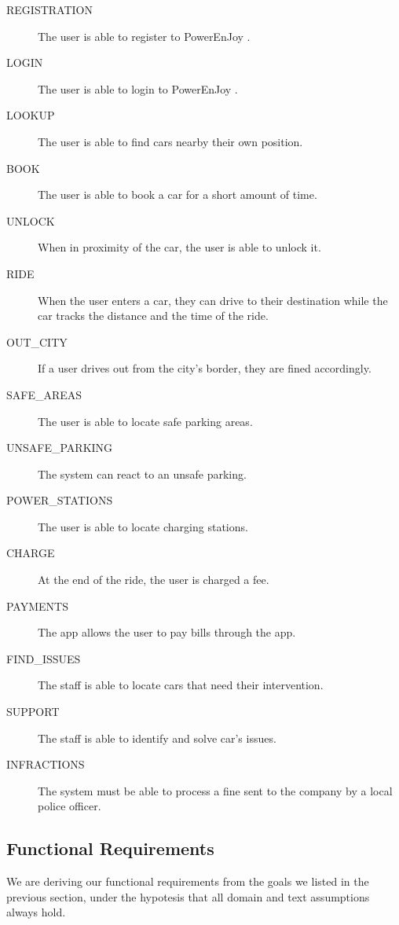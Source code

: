 \documentclass[11pt]{article} %
\newcommand{\pe}{PowerEnJoy }
\begin{document}
 \begin{description}
 	\item[REGISTRATION] The user is able to register to \pe.
	\item[LOGIN] The user is able to login to \pe.
 	\item[LOOKUP] The user is able to find cars nearby their own position.
 	\item[BOOK] The user is able to book a car for a short amount of time.
 	\item[UNLOCK] When in proximity of the car, the user is able to unlock it.
	\item[RIDE] When the user enters a car, they can drive to their destination while the car tracks the distance and the time of the ride.
	\item[OUT\_CITY] If a user drives out from the city's border, they are fined accordingly.
 	\item[SAFE\_AREAS] The user is able to locate safe parking areas.
	\item[UNSAFE\_PARKING] The system can react to an unsafe parking.
	\item[POWER\_STATIONS] The user is able to locate charging stations.
	\item[CHARGE] At the end of the ride, the user is charged a fee.
	\item[PAYMENTS] The app allows the user to pay bills through the app.
	\item[FIND\_ISSUES] The staff is able to locate cars that need their intervention.
	\item[SUPPORT] The staff is able to identify and solve car's issues.
	\item[INFRACTIONS] The system must be able to process a fine sent to the company by a local police officer.
 \end{description}


\subsection{Functional Requirements}

We are deriving our functional requirements from the goals we listed in the previous section, under the hypotesis that all domain and text assumptions always hold.
\end{document}
